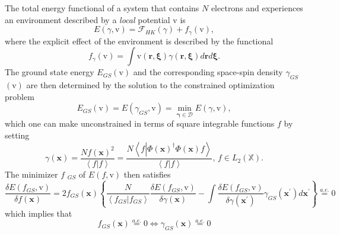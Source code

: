 \documentclass[aps,preprint]{revtex4}%
\begin{document}
The total energy functional of a system that contains $N$ electrons and
experiences an environment described by a \emph{local} potential $\mathrm{v}$
is
\begin{equation}
E\left(  \gamma\boldsymbol{,}\mathrm{v}\right)  =\mathcal{F}_{HK}\left(
\gamma\right)  +f_{\gamma}\left(  \mathrm{v}\right)  ,
\end{equation}
where the explicit effect of the environment is described by the functional
\begin{equation}
f_{\gamma}\left(  \mathrm{v}\right)  =\int\mathrm{v}\left(  \boldsymbol{r,\xi
}\right)  \gamma\left(  \boldsymbol{r,\xi}\right)  d\boldsymbol{r}%
d\boldsymbol{\xi.}%
\end{equation}
The ground state energy $E_{GS}\left(  \mathrm{v}\right)  $ and the
corresponding space-spin density $\gamma_{GS}$ $\left(  \mathrm{v}\right)  $
are then determined by the solution to the constrained optimization problem
\begin{equation}
E_{GS}\left(  \mathrm{v}\right)  =E\left(  \gamma_{GS}\boldsymbol{,}%
\mathrm{v}\right)  =\min_{\boldsymbol{\gamma\in}\mathcal{D}}E\left(
\gamma\boldsymbol{,}\mathrm{v}\right)  , \label{GS}%
\end{equation}
which one can make unconstrained in terms of square integrable functions $f$
by setting
\begin{equation}
\gamma\left(  \boldsymbol{x}\right)  =\frac{Nf\left(  \boldsymbol{x}\right)
^{2}}{\left\langle f|f\right\rangle }=\frac{N\left\langle f\left\vert
\Phi\left(  \boldsymbol{x}\right)  ^{\dagger}\Phi\left(  \boldsymbol{x}%
\right)  f\right.  \right\rangle }{\left\langle f|f\right\rangle },\,f\in
L_{2}\left(  \mathbb{X}\right)  .
\end{equation}
The minimizer $f$ $_{GS}$ of $E\left(  f\boldsymbol{,}\mathrm{v}\right)  $
then satisfies
\begin{equation}
\frac{\delta E\left(  f_{GS}\boldsymbol{,}\mathrm{v}\right)  }{\delta f\left(
\boldsymbol{x}\right)  }=2f_{GS}\left(  \boldsymbol{x}\right)  \left\{
\frac{N}{\left\langle f_{GS}|f_{GS}\right\rangle }\frac{\delta E\left(
f_{GS}\boldsymbol{,}\mathrm{v}\right)  }{\delta\gamma\left(  \boldsymbol{x}%
\right)  }-\int\frac{\delta E\left(  f_{GS}\boldsymbol{,}\mathrm{v}\right)
}{\delta\gamma\left(  \boldsymbol{x}^{\prime}\right)  }\gamma_{GS}\left(
\boldsymbol{x}^{\prime}\right)  d\boldsymbol{x}^{\prime}\right\}
\overset{a.e.}{=}0
\end{equation}
which implies that
\begin{equation}
f_{GS}\left(  \boldsymbol{x}\right)  \overset{a.e.}{=}0\Leftrightarrow
\gamma_{GS}\left(  \boldsymbol{x}\right)  \overset{a.e.}{=}0
\end{equation}
\end{document}
